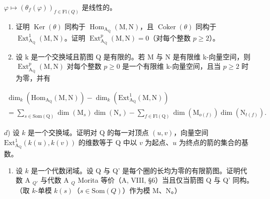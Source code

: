  \(\varphi\mapsto(\theta_{f}(\varphi))_{f\in\mathrm{Fl}(Q)}\) 是线性的。

\begin{enumerate}
\def\labelenumi{\alph{enumi})}
\setcounter{enumi}{1}
\item
  证明 \(\operatorname{Ker}(\theta)\) 同构于 \(\operatorname{Hom}_{\mathrm{A}_{\mathrm{Q}}}(\mathrm{M},\mathrm{N})\)，且 \(\operatorname{Coker}(\theta)\) 同构于 \(\operatorname{Ext}_{\mathrm{A}_{\mathrm{Q}}}^{1}(\mathrm{M},\mathrm{N})\)。证明 \(\operatorname{Ext}_{\mathrm{A}_{\mathrm{Q}}}^{p}(\mathrm{M},\mathrm{N}) = 0\)（对每个整数 \(p \geqslant 2\)）。
\item
  设 k 是一个交换域且箭图 Q 是有限的。若 M 与 N 是有限维 k-向量空间，则 \(\operatorname{Ext}_{\mathrm{A}_{\mathrm{Q}}}^{p}(\mathrm{M},\mathrm{N})\) 对每个整数 \(p \geqslant 0\) 是一个有限维 k-向量空间，且当 \(p \geqslant 2\) 时为零，并有
\end{enumerate}

\[
\begin{array}{l} \dim_ {k} (\mathrm{Hom} _ {\mathrm{A} _ {\mathrm{Q}}} (\mathrm{M}, \mathrm{N})) - \dim_ {k} (\mathrm{Ext} _ {\mathrm{A} _ {\mathrm{Q}}} ^ {1} (\mathrm{M}, \mathrm{N})) \\ = \sum_ {s \in \mathrm{Som} (\mathrm{Q})} \dim (\mathrm{M} _ {s}) \dim (\mathrm{N} _ {s}) - \sum_ {f \in \mathrm{Fl} (\mathrm{Q})} \dim (\mathrm{M} _ {o (f)}) \dim (\mathrm{N} _ {t (f)}). \end{array}
\]

\(d\)) 设 \(k\) 是一个交换域。证明对 Q 的每一对顶点 \((u,v)\)，向量空间 \(\mathrm{Ext}_{\mathrm{A_Q}}^1 (k(u),k(v))\) 的维数等于 Q 中以 \(v\) 为起点、\(u\) 为终点的箭的集合的基数。

\begin{enumerate}
\def\labelenumi{\arabic{enumi})}
\setcounter{enumi}{9}
\item
  设 \(k\) 是一个代数闭域。设 Q 与 Q' 是每个圈的长均为零的有限箭图。证明代数 A \(_{Q'}\) 与代数 A \(_{Q}\) Morita 等价（A, VIII, §6）当且仅当箭图 Q 与 Q' 同构。（取 \(k\)-单模 \(k(s)\)（\(s \in \text{Som}(Q)\)）作为模 M、N。）
\end{enumerate}

